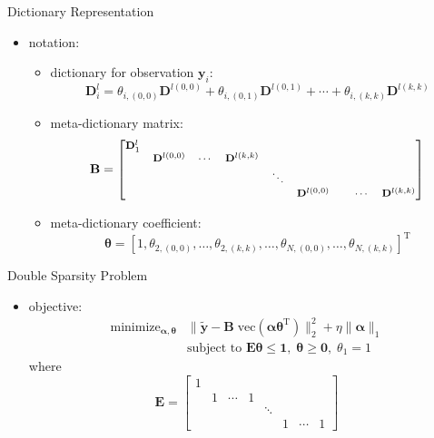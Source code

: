 \documentclass[fleqn,aspectratio=1610]{beamer}
\begin{document}
\begin{frame}[label={sec:org66aec86}]{Dictionary Representation}
\begin{itemize}
\item notation:
\begin{itemize}
\item dictionary for observation \(\boldsymbol{y}_{i}\):
\begin{equation}
  \mathbf{D}^{l}_{i}
  = \theta_{i,(0,0)}\mathbf{D}^{l(0,0)} +
  \theta_{i,(0,1)}\mathbf{D}^{l(0,1)} + \dotsb +
  \theta_{i,(k,k)}\mathbf{D}^{l(k,k)}
\end{equation}
\item meta-dictionary matrix:
\begin{equation}
  \mathbf{B}
  ={\footnotesize
    \begin{bmatrix}
      \mathbf{D}^l_{1} & & & & && \\
      & \mathbf{D}^{l(0,0)} & \cdots & \mathbf{D}^{l(k,k)} & & & & & \\
      & & & & \ddots & &  \\
      & & & & & \mathbf{D}^{l(0,0)} &  & \cdots & \mathbf{D}^{l(k,k)}
    \end{bmatrix}}
\end{equation}
\item meta-dictionary coefficient:
\begin{equation}
  \boldsymbol{\theta}
  =\left[
    1,\theta_{2,(0,0)},\dotsc,\theta_{2,(k,k)},\dotsc,
    \theta_{N,(0,0)},\dotsc,\theta_{N,(k,k)}\right]^{\mathrm{T}}
\end{equation}
\end{itemize}
\end{itemize}
\end{frame}

\begin{frame}[label={sec:org9ef7f0e}]{Double Sparsity Problem}
\begin{itemize}
\item objective:
\begin{align}
  \mathop{\text{minimize}}_{\boldsymbol{\alpha},\boldsymbol{\theta}}
  &
  \|\tilde{\boldsymbol{y}}-{\mathbf{B}}\;\mathrm{vec}
  \left(\boldsymbol{\alpha}\boldsymbol{\theta}^{\mathrm{T}}\right)\|_2^2 
  + \eta\|\boldsymbol{\alpha}\|_1\\
  &\text{subject to }
    \mathbf{E}\boldsymbol{\theta}\leq\mathbf{1}, 
    \;\boldsymbol{\theta}\geq\mathbf{0}, 
    \;\theta_{1}=1
\end{align}
where
\begin{equation}
  \mathbf{E} = \begin{bmatrix}
    1& &      & &      & &      & \\
     &1&\cdots&1&      & &      & \\
     & &      & &\ddots& &      & \\
     & &      & &      &1&\cdots&1
  \end{bmatrix}
\end{equation}
\end{itemize}
\end{frame}
\end{document}
